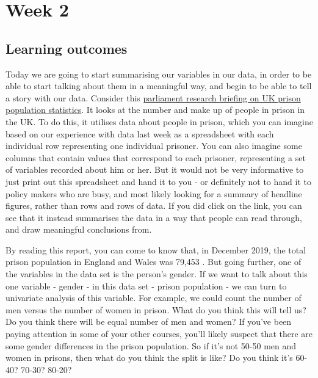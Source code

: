 \documentclass[
]{book}
\begin{document}
\hypertarget{week2}{%
\chapter{Week 2}\label{week2}}

\hypertarget{learning-outcomes-1}{%
\section{Learning outcomes}\label{learning-outcomes-1}}

Today we are going to start summarising our variables in our data, in order to be able to start talking about them in a meaningful way, and begin to be able to tell a story with our data. Consider this \href{http://researchbriefings.files.parliament.uk/documents/SN04334/SN04334.pdf}{parliament research briefing on UK prison population statistics}. It looks at the number and make up of people in prison in the UK. To do this, it utilises data about people in prison, which you can imagine based on our experience with data last week as a spreadsheet with each individual row representing one individual prisoner. You can also imagine some columns that contain values that correspond to each prisoner, representing a set of variables recorded about him or her. But it would not be very informative to just print out this spreadsheet and hand it to you - or definitely not to hand it to policy makers who are busy, and most likely looking for a summary of headline figures, rather than rows and rows of data. If you did click on the link, you can see that it instead summarises the data in a way that people can read through, and draw meaningful conclusions from.

By reading this report, you can come to know that, in December 2019, the total prison population in England and Wales was 79,453 . But going further, one of the variables in the data set is the person's gender. If we want to talk about this one variable - gender - in this data set - prison population - we can turn to univariate analysis of this variable. For example, we could count the number of men versus the number of women in prison. What do you think this will tell us? Do you think there will be equal number of men and women? If you've been paying attention in some of your other courses, you'll likely suspect that there are some gender differences in the prison population. So if it's not 50-50 men and women in prisons, then what do you think the split is like? Do you think it's 60-40? 70-30? 80-20?
\end{document}
